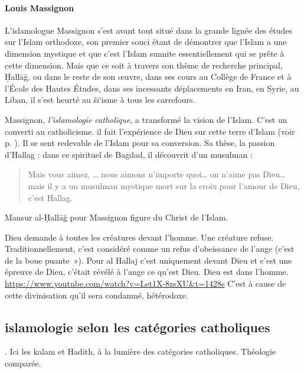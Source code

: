 \paragraph{Louis Massignon} \label{Theo:Massignon}

L’islamologue Massignon s’est avant tout situé dans la grande lignée des études sur l’Islam orthodoxe, son premier souci étant de démontrer que l’Islam a une dimension mystique et que c’est l’Islam sunnite essentiellement qui se prête à cette dimension. Mais que ce soit à travers son thème de recherche principal, Ḥallāğ, ou dans le reste de son œuvre, dans ses cours au Collège de France et à l’École des Hautes Études, dans ses incessants déplacements en Iran, en Syrie, au Liban, il s’est heurté au šī‘isme à tous les carrefours.

Massignon, \emph{l’islamologie catholique}, a transformé la vision de l’Islam. C’est un converti au catholicisme. il fait l’expérience de Dieu sur cette terre d’Islam (voir p. \pageref{fig:Ctesiphon}). Il se sent redevable de l’Islam pour sa conversion. Sa thèse, la passion d’Hallag : dans ce spirituel de Bagdad, il découvrit d’un musulman : 
\begin{quote}
Mais vous aimez, … nous aimons n’importe quoi… on n’aime pas Dieu… mais il y a un musulman mystique mort sur la croix pour l’amour de Dieu, c’est Hallag.
\end{quote}

{Mansur al-Ḥallāğ pour Massignon} figure du Christ de l'Islam.

  Dieu demande à toutes les créatures devant l'homme. Une créature
  refuse. Traditionnellement, c'est considéré comme un refus
  d'obeissance de l'ange (c'est de la boue puante~»). Pour al Hallaj
  c'est uniquement devant Dieu et c'est une épreuve de Dieu, c'était
  révélé à l'ange ce qu'est Dieu. Dieu est dans l'homme.
  \url{https://www.youtube.com/watch?v=Let1X-8zsXU\&t=1428s}
  C'est à cause de cette divinisation qu'il sera condamné, hétérodoxe.



\subsection{ islamologie selon les catégories catholiques}.
Ici les kalam et Hadith, à la lumière des catégories catholiques. Théologie comparée. 

